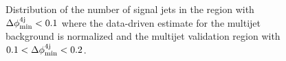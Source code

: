 \begin{figure}[h!]
\centering 
{}
\caption{Distribution of the number of signal jets in  the region with $\Delta\phi_{\rm{min}}^{4{\rm{j}}} < 0.1$ where the data-driven estimate for the multijet background is normalized and  the multijet validation region with $0.1 < \Delta\phi_{\rm{min}}^{4{\rm{j}}} < 0.2$.}\label{fig:jet_smear_jetn}
\end{figure} 



\clearpage 


